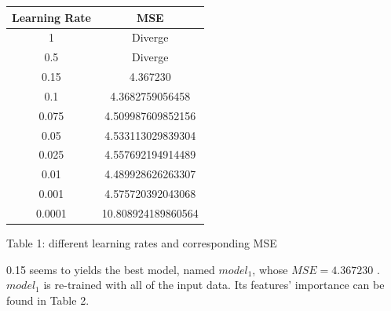 \documentclass[12pt,article]{article}
\begin{document}
\begin{center}
    \begin{tabular}{ |c|c|} 
        \hline
        Learning Rate & MSE \\
        \hline
        1       & Diverge \\ 
        0.5     & Diverge \\ 
        0.15    & 4.367230 \\ 
        0.1     & 4.3682759056458 \\ 
        0.075   & 4.509987609852156 \\ 
        0.05    & 4.533113029839304 \\ 
        0.025   & 4.557692194914489 \\ 
        0.01    & 4.489928626263307 \\ 
        0.001   & 4.575720392043068 \\ 
        0.0001  & 10.808924189860564 \\ 
        \hline
    \end{tabular}
    
    Table 1: different learning rates and corresponding MSE
\end{center}

0.15 seems to yields the best model, named \textbf{$model_1$}, whose $MSE = 4.367230$
. \textbf{$model_1$} is re-trained with all of the input data. Its features' 
importance can be found in Table 2.
\end{document}
